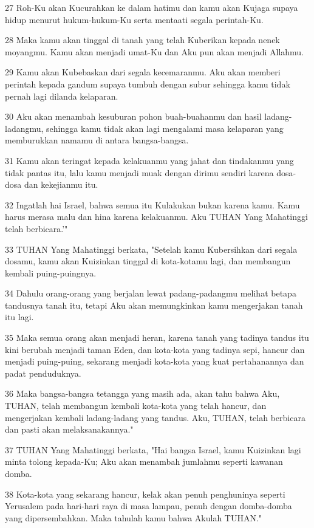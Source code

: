 \par 27 Roh-Ku akan Kucurahkan ke dalam hatimu dan kamu akan Kujaga supaya hidup menurut hukum-hukum-Ku serta mentaati segala perintah-Ku.
\par 28 Maka kamu akan tinggal di tanah yang telah Kuberikan kepada nenek moyangmu. Kamu akan menjadi umat-Ku dan Aku pun akan menjadi Allahmu.
\par 29 Kamu akan Kubebaskan dari segala kecemaranmu. Aku akan memberi perintah kepada gandum supaya tumbuh dengan subur sehingga kamu tidak pernah lagi dilanda kelaparan.
\par 30 Aku akan menambah kesuburan pohon buah-buahanmu dan hasil ladang-ladangmu, sehingga kamu tidak akan lagi mengalami masa kelaparan yang memburukkan namamu di antara bangsa-bangsa.
\par 31 Kamu akan teringat kepada kelakuanmu yang jahat dan tindakanmu yang tidak pantas itu, lalu kamu menjadi muak dengan dirimu sendiri karena dosa-dosa dan kekejianmu itu.
\par 32 Ingatlah hai Israel, bahwa semua itu Kulakukan bukan karena kamu. Kamu harus merasa malu dan hina karena kelakuanmu. Aku TUHAN Yang Mahatinggi telah berbicara.'"
\par 33 TUHAN Yang Mahatinggi berkata, "Setelah kamu Kubersihkan dari segala dosamu, kamu akan Kuizinkan tinggal di kota-kotamu lagi, dan membangun kembali puing-puingnya.
\par 34 Dahulu orang-orang yang berjalan lewat padang-padangmu melihat betapa tandusnya tanah itu, tetapi Aku akan memungkinkan kamu mengerjakan tanah itu lagi.
\par 35 Maka semua orang akan menjadi heran, karena tanah yang tadinya tandus itu kini berubah menjadi taman Eden, dan kota-kota yang tadinya sepi, hancur dan menjadi puing-puing, sekarang menjadi kota-kota yang kuat pertahanannya dan padat penduduknya.
\par 36 Maka bangsa-bangsa tetangga yang masih ada, akan tahu bahwa Aku, TUHAN, telah membangun kembali kota-kota yang telah hancur, dan mengerjakan kembali ladang-ladang yang tandus. Aku, TUHAN, telah berbicara dan pasti akan melaksanakannya."
\par 37 TUHAN Yang Mahatinggi berkata, "Hai bangsa Israel, kamu Kuizinkan lagi minta tolong kepada-Ku; Aku akan menambah jumlahmu seperti kawanan domba.
\par 38 Kota-kota yang sekarang hancur, kelak akan penuh penghuninya seperti Yerusalem pada hari-hari raya di masa lampau, penuh dengan domba-domba yang dipersembahkan. Maka tahulah kamu bahwa Akulah TUHAN."


